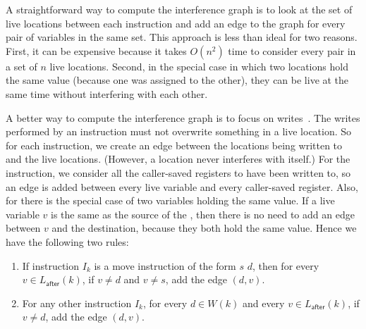 \documentclass[7x10]{TimesAPriori_MIT}%
\numberwithin{theorem}{chapter}
\numberwithin{definition}{chapter}
\numberwithin{equation}{chapter}
\begin{document}
A straightforward way to compute the interference graph is to look at
the set of live locations between each instruction and add an edge to
the graph for every pair of variables in the same set.  This approach
is less than ideal for two reasons. First, it can be expensive because
it takes $O(n^2)$ time to consider every pair in a set of $n$ live
locations. Second, in the special case in which two locations hold the
same value (because one was assigned to the other), they can be live
at the same time without interfering with each other.

A better way to compute the interference graph is to focus on
writes~\citep{Appel:2003fk}. The writes performed by an instruction
must not overwrite something in a live location. So for each
instruction, we create an edge between the locations being written to
and the live locations. (However, a location never interferes with
itself.) For the  instruction, we consider all the
caller-saved registers to have been written to, so an edge is added
between every live variable and every caller-saved register. Also, for
 there is the special case of two variables holding the same
value. If a live variable $v$ is the same as the source of the
, then there is no need to add an edge between $v$ and the
destination, because they both hold the same value.
%
Hence we have the following two rules:

\begin{enumerate}
\item If instruction $I_k$ is a move instruction of the form
   $s$\key{,} $d$, then for every $v \in
  L_{\mathsf{after}}(k)$, if $v \neq d$ and $v \neq s$, add the edge
  $(d,v)$.

\item For any other instruction $I_k$, for every $d \in W(k)$ and
  every $v \in L_{\mathsf{after}}(k)$, if $v \neq d$, add the edge
  $(d,v)$.
\end{enumerate}
\end{document}
